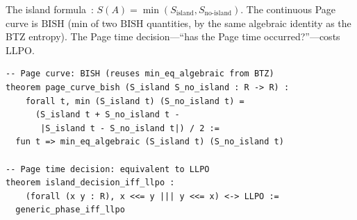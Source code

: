 \documentclass[11pt,a4paper]{article}
\theoremstyle{plain}
\theoremstyle{definition}
\newcommand{\LLPO}{\ensuremath{\mathrm{LLPO}}}
\newcommand{\BISH}{\ensuremath{\mathrm{BISH}}}
\begin{document}
The island formula~\cite{AEMM2019,Penington2019}:
$S(A) = \min(S_{\mathrm{island}}, S_{\mathrm{no\text{-}island}})$.
The continuous Page curve is $\BISH$ (min of two $\BISH$ quantities,
by the same algebraic identity as the BTZ entropy).
The Page time decision---``has the Page time occurred?''---costs $\LLPO$.

\begin{lstlisting}[caption={Island formula calibration: \texttt{IslandFormula.lean}}]
-- Page curve: BISH (reuses min_eq_algebraic from BTZ)
theorem page_curve_bish (S_island S_no_island : R -> R) :
    forall t, min (S_island t) (S_no_island t) =
      (S_island t + S_no_island t -
       |S_island t - S_no_island t|) / 2 :=
  fun t => min_eq_algebraic (S_island t) (S_no_island t)

-- Page time decision: equivalent to LLPO
theorem island_decision_iff_llpo :
    (forall (x y : R), x <<= y ||| y <<= x) <-> LLPO :=
  generic_phase_iff_llpo
\end{lstlisting}
\end{document}
